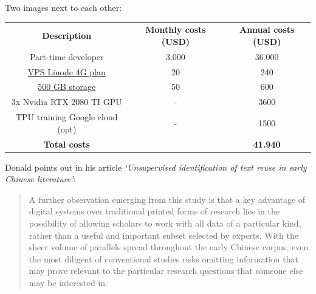 Two images next to each other:
\begin{figure}[!tbp]
  \centering
  \hfill
\end{figure}



\begin{tabular}{ c c c }
 \textbf{Description} & \textbf{Monthly costs (USD)} & \textbf{Annual costs (USD)} \\ 
 Part-time developer & 3.000 & 36.000 \\  
 \href{https://www.linode.com/pricing}{VPS Linode 4G plan} & 20 & 240 \\
  \href{https://www.linode.com/blockstorage}{500 GB storage} & 50 & 600 \\
  3x Nvidia RTX 2080 TI GPU & - & 3600 \\
  TPU training Google cloud (opt) & - & 1500 \\
 \textbf{Total costs} & & \textbf{41.940}
\end{tabular}


Donald \cite{sturgeon2017} points out in his article {\em `Unsupervised identification of text reuse in early Chinese literature'}: 

\begin{quote}
A further observation emerging from this study is that a key advantage of digital systems over traditional printed forms of research lies in the possibility of allowing scholars to work with all data of a particular kind, rather than a useful and important subset selected by experts. With the sheer volume of parallels spread throughout the early Chinese corpus, even the most diligent of conventional studies risks omitting information that may prove relevant to the particular research questions that someone else may be interested in.
\end{quote}
